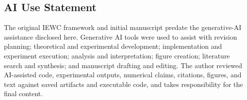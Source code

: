 \subsection*{AI Use Statement}

The original IEWC framework and initial manuscript predate the generative-AI
assistance disclosed here. Generative AI tools were used to assist with revision
planning; theoretical and experimental development; implementation and
experiment execution; analysis and interpretation; figure creation; literature
search and synthesis; and manuscript drafting and editing. The author reviewed
AI-assisted code, experimental outputs, numerical claims, citations, figures,
and text against saved artifacts and executable code, and takes responsibility
for the final content.
